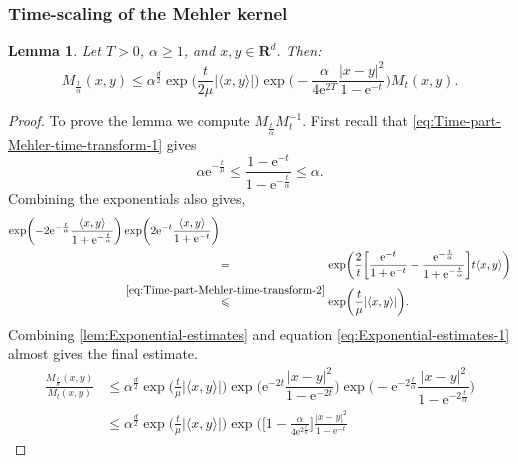 \documentclass[a4paper,oneside,10pt]{amsproc}
\newtheorem{lemma}{Lemma}
\theoremstyle{remark}
\newcommand{\la}{\langle}
\newcommand{\ra}{\rangle}
\renewcommand{\leq}{\leqslant}
\renewcommand{\leq}{\leqslant}
\renewcommand{\geq}{\geqslant}
\newcommand{\R}{\mathbf R}
\newcommand{\e}{\mathrm{e}} %
\renewcommand{\leq}{\leqslant}%
\renewcommand{\geq}{\geqslant}%
\begin{document}
\subsubsection{Time-scaling of the Mehler kernel}
\begin{lemma}\label{lem:Kernel-estimates-1}
  Let $T > 0$, $\alpha \geq 1$, and $x, y \in \R^d$. Then:
  \begin{equation}
    \label{eq:Kernel-lemma-1-estimate} 
    M_{\frac{t}{\alpha}}(x, y) \leq \alpha^{\frac{d}2}
    \exp\biggl (\frac{t}{2\mu} |\la x, y \ra| \biggr)
   \exp\biggl(-\frac{\alpha}{4\e^{2T}} \frac{|x - y|^2}{1 - \e^{-t}}
   \biggr) M_{t}(x, y).
  \end{equation}
\end{lemma}
\begin{proof}
  To prove the lemma we compute $M_{\frac{t}{\alpha}} M_t^{-1}$.
  First recall that \eqref{eq:Time-part-Mehler-time-transform-1} gives
  \begin{equation*}
    \alpha \e^{-\frac{t}\mu} \leq \frac{1 - \e^{-t}}{1 -
      \e^{-\frac{t}{\alpha}}} \leq \alpha.
  \end{equation*}
  Combining the exponentials also gives,
  \begin{align*}
    \exp \biggl (-2\e^{-\frac{t}\alpha} \frac{\la x, y \ra}{1 + \e^{-\frac{t}{\alpha}}}
    \biggr ) &\exp \biggl (2 \e^{-t} \frac{\la x, y \ra}{1 + \e^{-t}}
    \biggr )\\
    &\stackrel{\phantom{\eqref{eq:Time-part-Mehler-time-transform-2}}}{=}
    \exp\biggl (\frac2{t}\biggl[\frac{\e^{-t}}{1 + \e^{-t}} - \frac{\e^{-\frac{t}\alpha}}{1 +
      \e^{-\frac{t}{\alpha}}} \biggr] t \la x, y \ra \biggr)\\
    &\stackrel{\eqref{eq:Time-part-Mehler-time-transform-2}}{\leq}
    \exp\biggl (\frac{t}{\mu} |\la x, y \ra| \biggr).
  \end{align*}
  Combining \autoref{lem:Exponential-estimates} and equation
  \eqref{eq:Exponential-estimates-1} almost gives the final estimate.
  \begin{align*}
    \frac{M_{\frac{t}{\alpha}}(x, y)}{M_{t}(x, y)} &\leq
    \alpha^{\frac{d}2} \exp\biggl (\frac{t}{\mu} |\la x, y \ra| \biggr)
    \exp\biggl(\e^{-2t} \dfrac{|x - y|^2}{1 - \e^{-2t}} \biggr)
    \exp\biggl(-\e^{-2\frac{t}{\alpha}} \dfrac{|x - y|^2}{1 -
      \e^{-2\frac{t}{\alpha}}}  \biggr)\\ 
    &\leq \alpha^{\frac{d}2} \exp\biggl (\frac{t}{\mu} |\la x, y \ra|
    \biggr) \exp \biggl (\biggl[1 -\frac{\alpha}{4\e^{2
        \frac{t}{\kappa}}} \biggr]  \frac{|x - y|^2}{1 - \e^{-t}}

\end{align*}
\end{proof}
\end{document}
